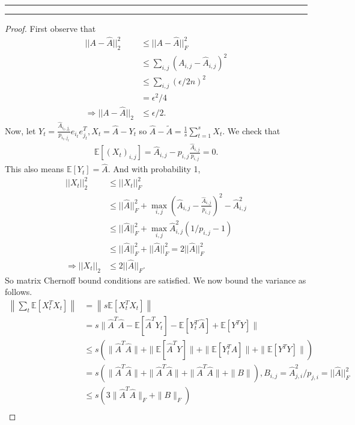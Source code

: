 \documentclass[11pt]{article}
\newcommand{\question}[1] {\vspace{.3in} \hrule\vspace{0.3em}
\noindent{\bf #1} \vspace{0.7em}
\hrule \vspace{.10in}}
\begin{document}
\newpage
\question{Task 2}
\begin{proof}
First observe that
\begin{align*}
    ||A - \widehat{A}||_2^2 &\le ||A - \widehat{A}||_F^2\\
    &\le \sum_{i,j} (A_{i,j} - \widehat{A}_{i,j})^2\\
    &\le \sum_{i,j} (\epsilon/2n)^2\\
    &= \epsilon^2/4\\
    \Rightarrow ||A - \widehat{A}||_2 &\le \epsilon/2.
\end{align*}
Now, let $Y_t = \frac{\widehat{A}_{i_t, j_t}}{p_{i_t, j_t}}e_{i_t}e_{j_t}^T, X_t = \widehat{A} - Y_t$ so $\widehat{A} - \widetilde{A} = \frac{1}{s}\sum_{t=1}^s X_t$. We check that
\begin{align*}
\mathbb{E}[(X_t)_{i,j}] = \widehat{A}_{i,j} - p_{i,j} \frac{\widehat{A}_{i,j}}{p_{i,j}} = 0.
\end{align*}
This also means $\mathbb{E}[Y_t] = \widehat{A}$. And with probability 1,
\begin{align*}
||X_t||_2^2 &\le ||X_t||_F^2\\
&\le ||\widehat{A}||_F^2 + \max_{i,j} \left(\widehat{A}_{i,j} - \frac{\widehat{A}_{i,j}}{p_{i,j}}\right)^2 - \widehat{A}_{i,j}^2\\
&\le ||\widehat{A}||_F^2 + \max_{i,j}\widehat{A}_{i,j}^2 (1/p_{i,j} - 1)\\
&\le ||\widehat{A}||_F^2 + ||\widehat{A}||_F^2 = 2||\widehat{A}||_F^2\\
\Rightarrow ||X_t||_2 &\le 2||\widehat{A}||_F.
\end{align*}
So matrix Chernoff bound conditions are satisfied. We now bound the variance as follows.
\begin{align*}
\left\| \sum_t \mathbb{E}[X_t^TX_t] \right\| &= \left\| s \mathbb{E}[X_t^TX_t] \right\|\\
&= s\|\widehat{A}^T \widehat{A} - \mathbb{E}[\widehat{A}^TY_t] - \mathbb{E}[Y_t^T \widehat{A}] + \mathbb{E}[Y^TY]\|\\
&\le s\left(\|\widehat{A}^T \widehat{A}\| + \|\mathbb{E}[\widehat{A}^TY] \| + \| \mathbb{E}[Y_t^T \widehat{A}] \| + \| \mathbb{E}[Y^TY]\|  \right)\\
&= s \left(\|\widehat{A}^T \widehat{A}\| + \|\widehat{A}^T \widehat{A}\| + \| \widehat{A}^T \widehat{A}\| + \|B\|\right), B_{i,j} = \widehat{A}_{j,i}^2/p_{j,i} = ||\widehat{A}||_F^2\\
&\le s \left(3\|\widehat{A}^T\widehat{A}\|_F + \|B\|_F\right)\\

\end{align*}
\end{proof}
\end{document}
